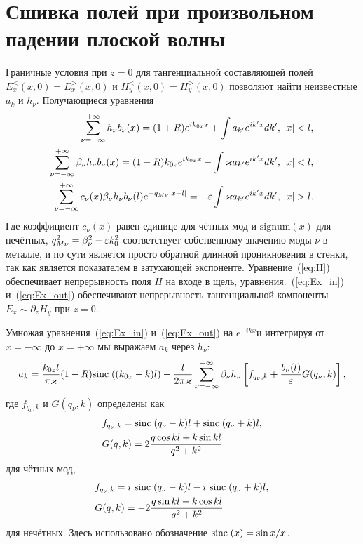 \section{Сшивка полей при произвольном падении плоской волны}

 Граничные условия при $z = 0$ для тангенциальной составляющей полей $E_x^<(x,0) = E_x^>(x,0) $ и $H_y^<(x,0) = H_y^>(x,0)$ 
 позволяют найти неизвестные $a_k$ и $h_\nu$. Получающиеся уравнения
\begin{align}
\sum_{\nu = -\infty}^{+\infty} h_\nu b_\nu (x) = (1+R)e^{ik_{0x}x} 
+ \int a_{k'} e^{ik'x} dk', & \ \abs{x}<l, \label{eq:H} \\
\sum_{\nu = -\infty}^{+\infty} \beta_\nu h_\nu b_\nu(x) = (1-R)k_{0z}e^{ik_{0x}x}
- \int \varkappa a_{k'} e^{ik'x} dk', &\ \abs{x}<l,  \label{eq:Ex_in} \\
\sum_{\nu = -\infty}^{+\infty} c_\nu(x)\beta_\nu h_\nu b_\nu(l) e^{-q_{M\nu}\abs{x-l}} = 
 -\eps \int \varkappa a_{k'} e^{ik'x} dk', &\ \abs{x}>l. \label{eq:Ex_out}
\end{align}
Где коэффициент $c_\nu(x)$ равен единице для чётных мод и $\text{signum}(x)$ для нечётных, $q_{M\nu}^2 = \beta_\nu^2 - \varepsilon k_0^2$
соответствует собственному значению моды $\nu$ в металле, и по сути является просто обратной длинной проникновения в стенки, так как 
является показателем в затухающей экспоненте. Уравнение~(\ref{eq:H}) обеспечивает непрерывность поля $H$ на входе в щель, 
уравнения.~(\ref{eq:Ex_in}) и~(\ref{eq:Ex_out}) обеспечивают непрерывность тангенциальной компоненты $E_x \sim \partial_{z} H_y$ при $z = 0$.

Умножая уравнения~(\ref{eq:Ex_in}) и~(\ref{eq:Ex_out}) на $e^{-ikx}$и интегрируя от $x = -\infty$ до $x = +\infty$  
мы выражаем $a_k$ через $h_\nu$:
\begin{align}
a_k = \frac{k_{0z}l }{\pi \varkappa} (1-R)\mathrm{sinc}\;((k_{0x}-k)l) 
        - \frac{l}{2 \pi \varkappa}\sum_{\nu = -\infty}^{+\infty} \beta_\nu h_\nu\left[f_{q_\nu,k}
+ \frac{b_\nu(l)}{\varepsilon}G(q_\nu,k)\right],
\end{align}
где $f_{q_\nu,k}$ и $G(q_\nu,k)$ определены как 
\begin{align*}
&f_{q_\nu,k} =
\mathrm{sinc}\;(q_\nu-k)l + \mathrm{sinc}\;(q_\nu+k)l,\\
&G(q,k) = 2\frac{q\cos{kl}+k\sin{kl}}{q^2 + k^2}\\
\end{align*}
для чётных мод,
\begin{align}
&f_{q_\nu,k} = i\ \mathrm{sinc}\;(q_\nu-k)l - i\ \mathrm{sinc}\;(q_\nu+k)l,\nonumber\\
& G(q,k) = -2\frac{q\sin{kl}+k\cos{kl}}{q^2 + k^2}
\end{align}
для нечётных.
Здесь использовано обозначение  $\mathrm{sinc}\;(x) = {\sin{x}}/{x}$.

